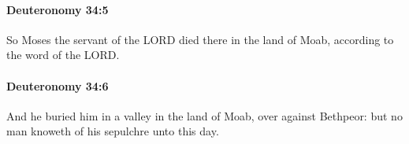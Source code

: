 		\paragraph{Deuteronomy 34:5} %
			\label{DEUTERONOMY-34-5}

			So Moses the servant of the LORD died there in the land of Moab, according to the word of the LORD.


		\paragraph{Deuteronomy 34:6} %
			\label{DEUTERONOMY-34-6}

			And he buried him in a valley in the land of Moab, over against Bethpeor: but no man knoweth of his sepulchre unto this day.


